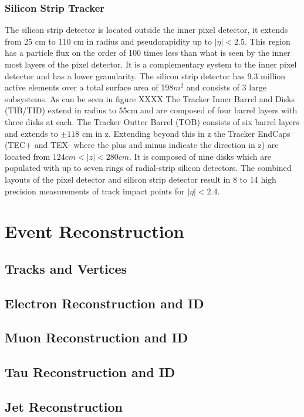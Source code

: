 \documentclass[oneside, letterpaper, 12pt, oldfontcommands]{memoir}
\begin{document}
\subsection{Silicon Strip Tracker}
The silicon strip detector is located outside the inner pixel detector, 
it extends from 25 cm to 110 cm in radius and pseudorapidity up to $|\eta|<2.5$. 
This region has a particle flux on 
the order of 100 times less than what is seen by the inner most layers of 
the pixel detector. It is a complementary system to the inner pixel
detector and has a lower granularity. The silicon strip detector 
has 9.3 million active elements over a total surface area of 198$m^{2}$
and consists of 3 large subsystems. As can be seen in figure XXXX %
The Tracker Inner Barrel and Disks (TIB/TID) extend in radius to
55cm and are composed of four barrel layers with three disks at each.
The Tracker Outter Barrel (TOB) consists of six barrel layers and extends to $\pm118$ cm
in z. Extending beyond this in z the Tracker EndCaps (TEC+ and TEX- where the plus and minus
indicate the direction in z) are located from $124cm<|z|<280cm$. It is composed of 
nine disks which are populated with up to seven rings of radial-strip silicon detectors.
The combined layouts of the pixel detector and silicon strip detector
result in 8 to 14 high precision measurements of track impact points for 
$|\eta|<2.4$.


\chapter{Event Reconstruction}
\section{Tracks and Vertices}
\section{Electron Reconstruction and ID}
\section{Muon Reconstruction and ID}
\section{Tau Reconstruction and ID}
\section{Jet Reconstruction}
\end{document}
